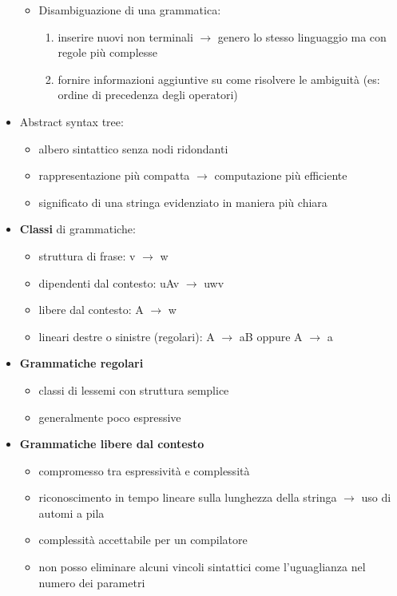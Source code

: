 \documentclass{article}
\begin{document}
\begin{itemize}
\begin{itemize}
  \item Disambiguazione di una grammatica:
  \begin{enumerate}
    \item inserire nuovi non terminali $\rightarrow$ genero lo stesso linguaggio ma con regole più complesse
    \item fornire informazioni aggiuntive su come risolvere le ambiguità (es: ordine di precedenza degli operatori)
  \end{enumerate}
  \end{itemize} 
  \item Abstract syntax tree: 
  \begin{itemize}
    \item albero sintattico senza nodi ridondanti
    \item rappresentazione più compatta $\rightarrow$ computazione più efficiente
    \item significato di una stringa evidenziato in maniera più chiara
  \end{itemize}
  \item \textbf{Classi} di grammatiche:
  \begin{itemize}
    \item struttura di frase: v $\rightarrow$ w
    \item dipendenti dal contesto: uAv $\rightarrow$ uwv
    \item libere dal contesto: A $\rightarrow$ w
    \item lineari destre o sinistre (regolari): A $\rightarrow$ aB oppure A $\rightarrow$ a 
  \end{itemize}
  \item \textbf{Grammatiche regolari}
  \begin{itemize}
    \item classi di lessemi con struttura semplice
    \item generalmente poco espressive
  \end{itemize}
  \item \textbf{Grammatiche libere dal contesto}
  \begin{itemize}
    \item compromesso tra espressività e complessità
    \item riconoscimento in tempo lineare sulla lunghezza della stringa $\rightarrow$ uso di automi a pila
    \item complessità accettabile per un compilatore
    \item non posso eliminare alcuni vincoli sintattici come l'uguaglianza nel numero dei parametri
  \end{itemize}
\end{itemize}
\end{document}
